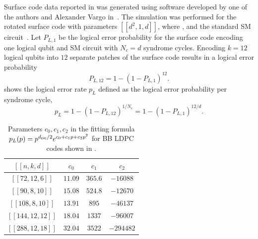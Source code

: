 \documentclass{article}
\begin{document}


Surface code data reported in  was generated using software developed by one of the authors and Alexander Vargo in~\cite{bravyi2013simulation}. The simulation was performed for the rotated surface code with parameters $[[d^2,1,d]]$,
where  
,
and the standard SM
 circuit~\cite{fowler2009high}.
Let $P_{L,1}$ be the logical error probability 
for the surface code encoding one logical qubit and SM circuit with $N_c=d$ syndrome cycles. 
Encoding $k=12$ logical qubits into $12$ separate patches of the surface code results in a logical error probability
\[
P_{L,12} =
 1-(1-P_{L,1})^{12}.
\]
 shows the logical error rate $p_L$ defined as the logical error probability per syndrome cycle,
\[
p_L = 1-(1-P_{L,12})^{1/N_c} = 1-(1-P_{L,1})^{12/d}.
\]


\begin{table}[t]
\begin{center}
\begin{tabular}{c|c|c|c}
\hline
$[[n,k,d]]$ & $c_0$ & $c_1$ & $c_2$ \\
\hline
\hline
$[[72,12,6]]$ & $11.09$  & $365.6$ &  $-16088$  \\
\hline 
$[[90,8,10]]$ & $15.08$  & $524.8$ &  $-12670$  \\
\hline
$[[108,8,10]]$ & $13.91$  & $895$ & $-46137$    \\
\hline
$[[144,12,12]]$ & $18.04$  &  $1337$ & $-96007$    \\
\hline
$[[288,12,18]]$ & $32.04$  & $3522$ & $-294482$    \\
\end{tabular}
\end{center}
\caption{Parameters
$c_0,c_1,c_2$ in the fitting formula 
$p_L(p)=p^{d_{\mathsf{circ}}/2} e^{c_0 + c_1 p + c_2 p^2}$ 
for BB LDPC codes shown in .}
\label{table:fit}
\end{table}
\end{document}
